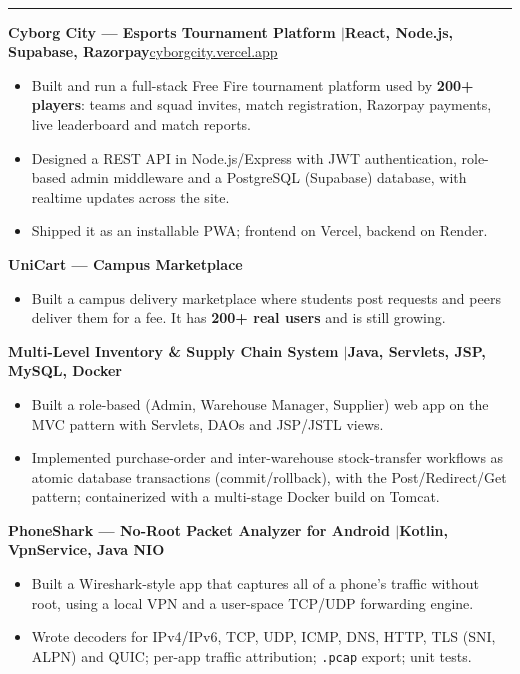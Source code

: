 \documentclass[10pt,a4paper]{article}
\renewcommand{\section}[1]{\vspace{6pt}{\large\bfseries\MakeUppercase{#1}}\\[-7pt]\rule{\textwidth}{0.6pt}\vspace{2pt}}
\newcommand{\entry}[2]{\par\textbf{#1}\hfill #2\par}
\newenvironment{points}{\vspace{-4pt}\begin{itemize}\setlength{\itemsep}{0pt}\setlength{\parskip}{0pt}\setlength{\topsep}{0pt}\setlength{\partopsep}{0pt}\setlength{\leftmargin}{12pt}}{\end{itemize}\vspace{-2pt}}
\newcommand{\sep}{\enspace$|$\enspace}
\begin{document}
\section{Projects}
\entry{Cyborg City --- Esports Tournament Platform \textnormal{\sep React, Node.js, Supabase, Razorpay}}{\href{https://cyborgcity.vercel.app}{cyborgcity.vercel.app}}
\begin{points}
  \item Built and run a full-stack Free Fire tournament platform used by \textbf{200+ players}: teams and squad invites, match registration, Razorpay payments, live leaderboard and match reports.
  \item Designed a REST API in Node.js/Express with JWT authentication, role-based admin middleware and a PostgreSQL (Supabase) database, with realtime updates across the site.
  \item Shipped it as an installable PWA; frontend on Vercel, backend on Render.
\end{points}
\entry{UniCart --- Campus Marketplace}{}
\begin{points}
  \item Built a campus delivery marketplace where students post requests and peers deliver them for a fee. It has \textbf{200+ real users} and is still growing.
\end{points}
\entry{Multi-Level Inventory \& Supply Chain System \textnormal{\sep Java, Servlets, JSP, MySQL, Docker}}{}
\begin{points}
  \item Built a role-based (Admin, Warehouse Manager, Supplier) web app on the MVC pattern with Servlets, DAOs and JSP/JSTL views.
  \item Implemented purchase-order and inter-warehouse stock-transfer workflows as atomic database transactions (commit/rollback), with the Post/Redirect/Get pattern; containerized with a multi-stage Docker build on Tomcat.
\end{points}
\entry{PhoneShark --- No-Root Packet Analyzer for Android \textnormal{\sep Kotlin, VpnService, Java NIO}}{}
\begin{points}
  \item Built a Wireshark-style app that captures all of a phone's traffic without root, using a local VPN and a user-space TCP/UDP forwarding engine.
  \item Wrote decoders for IPv4/IPv6, TCP, UDP, ICMP, DNS, HTTP, TLS (SNI, ALPN) and QUIC; per-app traffic attribution; \texttt{.pcap} export; unit tests.
\end{points}
\end{document}
